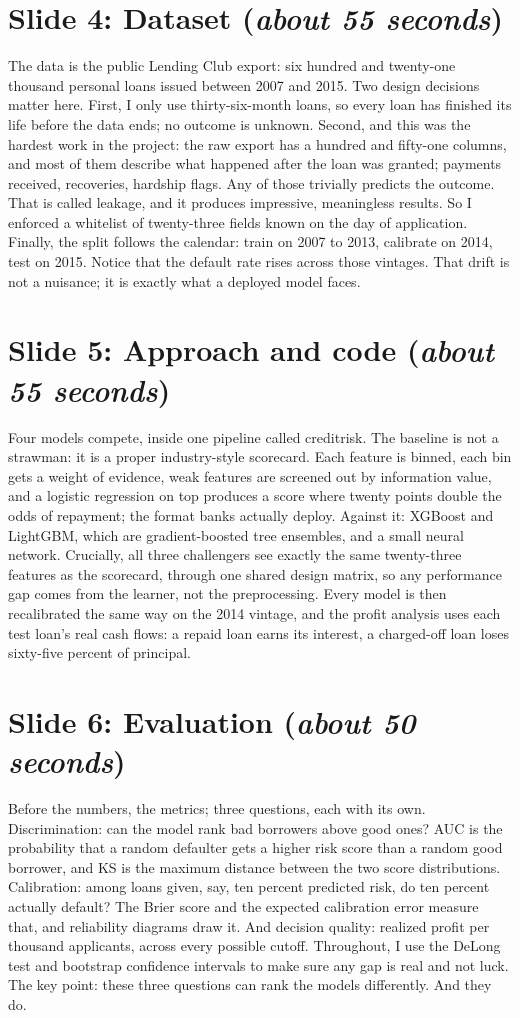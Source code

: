 \documentclass[a4paper,11pt]{article}
\newcommand{\slideblock}[3]{%
  \section*{Slide #1: #2 \hfill \normalfont\small(\textit{#3})}}
\begin{document}
\slideblock{4}{Dataset}{about 55 seconds}
The data is the public Lending Club export: six hundred and twenty-one thousand personal loans issued between 2007 and 2015. Two design decisions matter here. First, I only use thirty-six-month loans, so every loan has finished its life before the data ends; no outcome is unknown. Second, and this was the hardest work in the project: the raw export has a hundred and fifty-one columns, and most of them describe what happened after the loan was granted; payments received, recoveries, hardship flags. Any of those trivially predicts the outcome. That is called leakage, and it produces impressive, meaningless results. So I enforced a whitelist of twenty-three fields known on the day of application. Finally, the split follows the calendar: train on 2007 to 2013, calibrate on 2014, test on 2015. Notice that the default rate rises across those vintages. That drift is not a nuisance; it is exactly what a deployed model faces.

\slideblock{5}{Approach and code}{about 55 seconds}
Four models compete, inside one pipeline called creditrisk. The baseline is not a strawman: it is a proper industry-style scorecard. Each feature is binned, each bin gets a weight of evidence, weak features are screened out by information value, and a logistic regression on top produces a score where twenty points double the odds of repayment; the format banks actually deploy. Against it: XGBoost and LightGBM, which are gradient-boosted tree ensembles, and a small neural network. Crucially, all three challengers see exactly the same twenty-three features as the scorecard, through one shared design matrix, so any performance gap comes from the learner, not the preprocessing. Every model is then recalibrated the same way on the 2014 vintage, and the profit analysis uses each test loan's real cash flows: a repaid loan earns its interest, a charged-off loan loses sixty-five percent of principal.

\slideblock{6}{Evaluation}{about 50 seconds}
Before the numbers, the metrics; three questions, each with its own. Discrimination: can the model rank bad borrowers above good ones? AUC is the probability that a random defaulter gets a higher risk score than a random good borrower, and KS is the maximum distance between the two score distributions. Calibration: among loans given, say, ten percent predicted risk, do ten percent actually default? The Brier score and the expected calibration error measure that, and reliability diagrams draw it. And decision quality: realized profit per thousand applicants, across every possible cutoff. Throughout, I use the DeLong test and bootstrap confidence intervals to make sure any gap is real and not luck. The key point: these three questions can rank the models differently. And they do.
\end{document}
